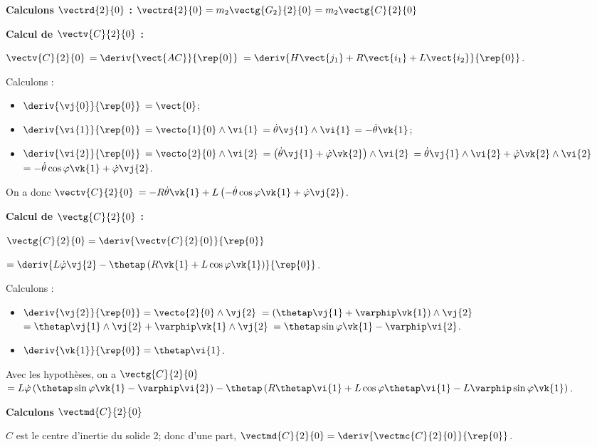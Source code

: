 \textbf{Calculons $\vectrd{2}{0}$ : } 
$\vectrd{2}{0} = m_2\vectg{G_2}{2}{0}=m_2 \vectg{C}{2}{0} $

\textbf{Calcul de $\vectv{C}{2}{0}$ : }  

$\vectv{C}{2}{0}$ 
$=\deriv{\vect{AC}}{\rep{0}}$
$=\deriv{H\vect{j_1}+R\vect{i_1}+L\vect{i_2}}{\rep{0}}$.

Calculons : 
\begin{itemize}
\item $\deriv{\vj{0}}{\rep{0}}$ $=\vect{0}$;
\item $\deriv{\vi{1}}{\rep{0}}$ $=\vecto{1}{0} \wedge \vi{1}$ $=\dot{\theta}\vj{1} \wedge \vi{1}$ $=-\dot{\theta}\vk{1}$;
\item $\deriv{\vi{2}}{\rep{0}}$ $=\vecto{2}{0} \wedge \vi{2}$ 
$=\left(\dot{\theta}\vj{1} + \dot{\varphi}\vk{2}\right)\wedge \vi{2}$
$=\dot{\theta}\vj{1}\wedge \vi{2} + \dot{\varphi}\vk{2}\wedge \vi{2}$
$=-\dot{\theta}\cos\varphi\vk{1} + \dot{\varphi}\vj{2}$.
\end{itemize}

On a donc 
$\vectv{C}{2}{0}$ 
$= -R\dot{\theta}\vk{1}+L\left(-\dot{\theta}\cos\varphi\vk{1} + \dot{\varphi}\vj{2}\right)$.

\textbf{Calcul de $\vectg{C}{2}{0}$ : }  

$\vectg{C}{2}{0} =\deriv{\vectv{C}{2}{0}}{\rep{0}}$

$ =\deriv{ L\dot{\varphi}\vj{2}-\thetap\left( R\vk{1}+L\cos\varphi\vk{1}\right)}{\rep{0}} $.

Calculons :
\begin{itemize}
\item $\deriv{\vj{2}}{\rep{0}}=\vecto{2}{0}\wedge\vj{2}$ 
$=\left(\thetap\vj{1}+\varphip\vk{1} \right)\wedge\vj{2}$ 
$=\thetap\vj{1}\wedge\vj{2}+\varphip\vk{1} \wedge\vj{2}$
$=\thetap\sin\varphi\vk{1}-\varphip\vi{2} $.
\item $\deriv{\vk{1}}{\rep{0}} = \thetap\vi{1}$.
\end{itemize}


Avec les hypothèses, on a $\vectg{C}{2}{0} $
$ =L\dot{\varphi}\left(\thetap\sin\varphi\vk{1}-\varphip\vi{2}\right)
-\thetap\left( R \thetap\vi{1} +L\cos\varphi \thetap\vi{1}
-L\varphip\sin\varphi\vk{1}\right)
$.



\vspace{.5cm}

\textbf{Calculons $\vectmd{C}{2}{0}$}

$C$ est le centre d'inertie du solide 2; donc 
d'une part, $\vectmd{C}{2}{0} = \deriv{\vectmc{C}{2}{0} }{\rep{0}}$.

